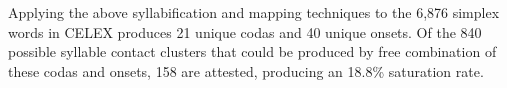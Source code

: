 
Applying the above syllabification and mapping techniques to the 6,876 simplex words in CELEX produces 21 unique codas and 40 unique onsets. Of the 840 possible syllable contact clusters that could be produced by free combination of these codas and onsets, 158 are attested, producing an 18.8\% saturation rate. 

